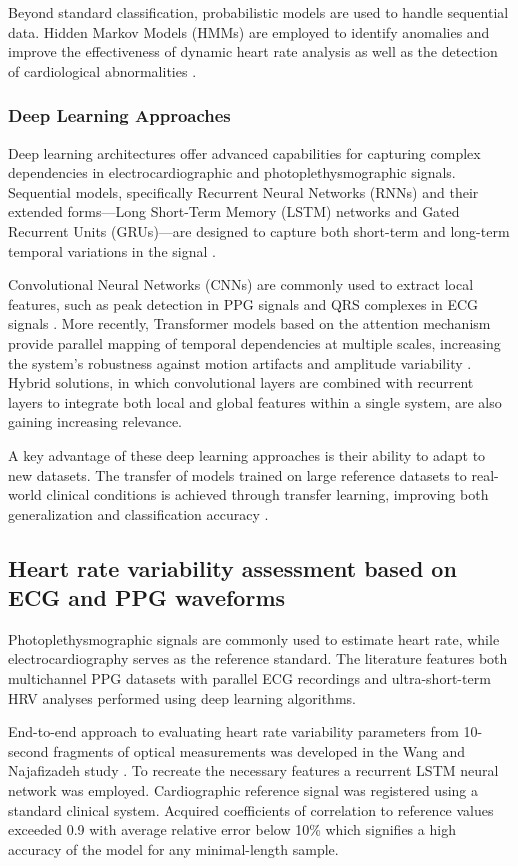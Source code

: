 \documentclass{citask}
\begin{document}
Beyond standard classification, probabilistic models are used to handle sequential data. Hidden Markov Models (HMMs) are employed to identify anomalies and improve the effectiveness of dynamic heart rate analysis as well as the detection of cardiological abnormalities \cite{13}.

\subsubsection{Deep Learning Approaches}
Deep learning architectures offer advanced capabilities for capturing complex dependencies in electrocardiographic and photoplethysmographic signals. Sequential models, specifically Recurrent Neural Networks (RNNs) and their extended forms—Long Short-Term Memory (LSTM) networks and Gated Recurrent Units (GRUs)—are designed to capture both short-term and long-term temporal variations in the signal \cite{12}.

Convolutional Neural Networks (CNNs) are commonly used to extract local features, such as peak detection in PPG signals and QRS complexes in ECG signals \cite{14}. More recently, Transformer models based on the attention mechanism provide parallel mapping of temporal dependencies at multiple scales, increasing the system's robustness against motion artifacts and amplitude variability \cite{15}. Hybrid solutions, in which convolutional layers are combined with recurrent layers to integrate both local and global features within a single system, are also gaining increasing relevance.

A key advantage of these deep learning approaches is their ability to adapt to new datasets. The transfer of models trained on large reference datasets to real-world clinical conditions is achieved through transfer learning, improving both generalization and classification accuracy \cite{16}.

\subsection{Heart rate variability assessment based on ECG and PPG waveforms}
Photoplethysmographic signals are commonly used to estimate heart rate, while electrocardiography serves as the reference standard. The literature features both multichannel PPG datasets with parallel ECG recordings and ultra-short-term HRV analyses performed using deep learning algorithms.

End-to-end approach to evaluating heart rate variability parameters from 10-second fragments of optical measurements was developed in the Wang and Najafizadeh study \cite{17}. To recreate the necessary features a recurrent LSTM neural network was employed. Cardiographic reference signal was registered using a standard clinical system. Acquired coefficients of correlation to reference values exceeded 0.9 with average relative error below 10\% which signifies a high accuracy of the model for any minimal-length sample.
\end{document}
